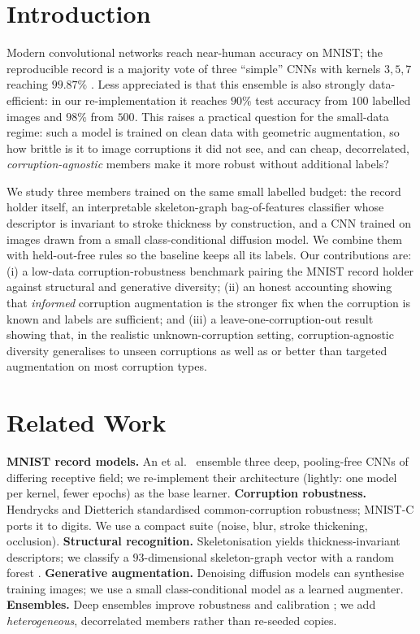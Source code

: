 \documentclass[conference]{IEEEtran}
\begin{document}
\section{Introduction}
Modern convolutional networks reach near-human accuracy on MNIST; the reproducible record is
a majority vote of three ``simple'' CNNs with kernels $3,5,7$ reaching $99.87\%$
\cite{An2020}. Less appreciated is that this ensemble is also strongly data-efficient: in our
re-implementation it reaches $90\%$ test accuracy from $100$ labelled images and $98\%$ from
$500$. This raises a practical question for the small-data regime: such a model is trained on
clean data with geometric augmentation, so how brittle is it to image corruptions it did not
see, and can cheap, decorrelated, \emph{corruption-agnostic} members make it more robust
without additional labels?

We study three members trained on the same small labelled budget: the record holder itself,
an interpretable skeleton-graph bag-of-features classifier whose descriptor is invariant to
stroke thickness by construction, and a CNN trained on images drawn from a small
class-conditional diffusion model. We combine them with held-out-free rules so the baseline
keeps all its labels. Our contributions are: (i) a low-data corruption-robustness benchmark
pairing the MNIST record holder against structural and generative diversity; (ii) an honest
accounting showing that \emph{informed} corruption augmentation is the stronger fix when the
corruption is known and labels are sufficient; and (iii) a leave-one-corruption-out result
showing that, in the realistic unknown-corruption setting, corruption-agnostic diversity
generalises to unseen corruptions as well as or better than targeted augmentation on most
corruption types.

\section{Related Work}
\textbf{MNIST record models.} An et al.\ \cite{An2020} ensemble three deep, pooling-free CNNs
of differing receptive field; we re-implement their architecture (lightly: one model per
kernel, fewer epochs) as the base learner. \textbf{Corruption robustness.} Hendrycks and
Dietterich \cite{Hendrycks2019} standardised common-corruption robustness; MNIST-C
\cite{Mu2019} ports it to digits. We use a compact suite (noise, blur, stroke thickening,
occlusion). \textbf{Structural recognition.} Skeletonisation \cite{GuoHall1989} yields
thickness-invariant descriptors; we classify a $93$-dimensional skeleton-graph vector with a
random forest \cite{Breiman2001}. \textbf{Generative augmentation.} Denoising diffusion models
\cite{Ho2020,Song2021} can synthesise training images; we use a small class-conditional model
as a learned augmenter. \textbf{Ensembles.} Deep ensembles improve robustness and calibration
\cite{Lakshminarayanan2017}; we add \emph{heterogeneous}, decorrelated members rather than
re-seeded copies.
\end{document}

